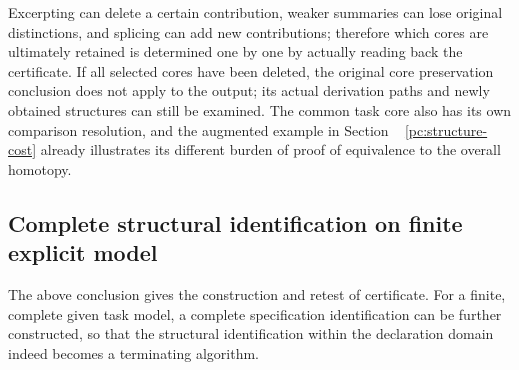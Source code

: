 \documentclass[11pt,a4paper]{article}
\theoremstyle{plain}
\theoremstyle{definition}
\theoremstyle{remark}
\begin{document}
\begin{CJK*}
Excerpting can delete a certain contribution, weaker summaries can lose original distinctions, and splicing can add new contributions; therefore which cores are ultimately retained is determined one by one by actually reading back the certificate. If all selected cores have been deleted, the original core preservation conclusion does not apply to the output; its actual derivation paths and newly obtained structures can still be examined. The common task core also has its own comparison resolution, and the augmented example in Section ~ \ref{pc:structure-cost} already illustrates its different burden of proof of equivalence to the overall homotopy.

\subsection { Complete structural identification on finite explicit model }\label{ar:finite-recognition}


The above conclusion gives the construction and retest of certificate. For a finite, complete given task model, a complete specification identification can be further constructed, so that the structural identification within the declaration domain indeed becomes a terminating algorithm.


\end{CJK*}
\end{document}
